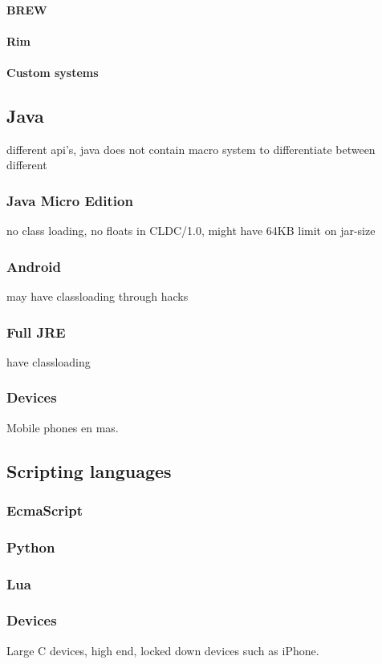 \paragraph{BREW}
\paragraph{Rim}
\paragraph{Custom systems}

\subsection{Java}
different api's, java does not contain macro system to differentiate between different 
\subsubsection{Java Micro Edition}
no class loading, 
no floats in CLDC/1.0,
might have 64KB limit on jar-size
\subsubsection{Android}
may have classloading through hacks
\subsubsection{Full JRE}
have classloading
\subsubsection{Devices}
Mobile phones en mas.


\subsection{Scripting languages}
\subsubsection{EcmaScript}
\subsubsection{Python}
\subsubsection{Lua}
\subsubsection{Devices}
Large C devices, high end, locked down devices such as iPhone.

